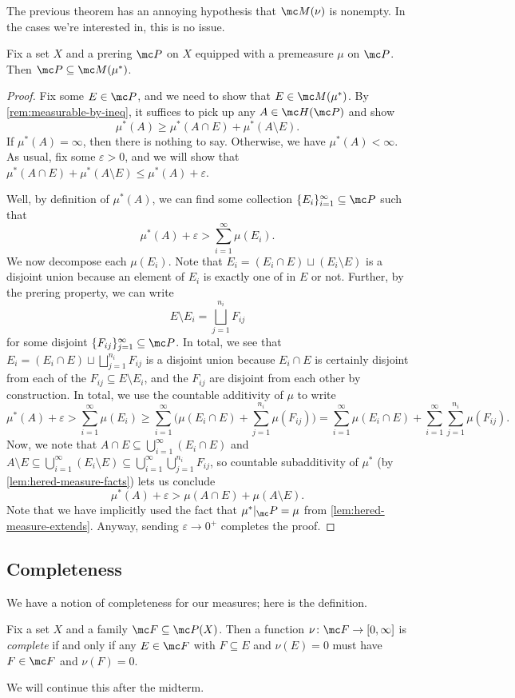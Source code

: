 \documentclass[../notes.tex]{subfiles}
\begin{document}
The previous theorem has an annoying hypothesis that $\mc M(\nu)$ is nonempty. In the cases we're interested in, this is no issue.
\begin{theorem} \label{thm:prering-is-measurable}
	Fix a set $X$ and a prering $\mc P$ on $X$ equipped with a premeasure $\mu$ on $\mc P$. Then $\mc P\subseteq\mc M(\mu^*)$.
\end{theorem}
\begin{proof}
	Fix some $E\in\mc P$, and we need to show that $E\in\mc M(\mu^*)$. By \autoref{rem:measurable-by-ineq}, it suffices to pick up any $A\in\mc H(\mc P)$ and show
	\[\mu^*(A)\ge\mu^*(A\cap E)+\mu^*(A\setminus E).\]
	If $\mu^*(A)=\infty$, then there is nothing to say. Otherwise, we have $\mu^*(A)<\infty$. As usual, fix some $\varepsilon>0$, and we will show that $\mu^*(A\cap E)+\mu^*(A\setminus E)\le\mu^*(A)+\varepsilon$.

	Well, by definition of $\mu^*(A)$, we can find some collection $\{E_i\}_{i=1}^\infty\subseteq\mc P$ such that
	\[\mu^*(A)+\varepsilon>\sum_{i=1}^\infty\mu(E_i).\]
	We now decompose each $\mu(E_i)$. Note that $E_i=(E_i\cap E)\sqcup(E_i\setminus E)$ is a disjoint union because an element of $E_i$ is exactly one of in $E$ or not. Further, by the prering property, we can write
	\[E\setminus E_i=\bigsqcup_{j=1}^{n_i}F_{ij}\]
	for some disjoint $\{F_{ij}\}_{j=1}^\infty\subseteq\mc P$. In total, we see that $E_i=(E_i\cap E)\sqcup\bigsqcup_{j=1}^{n_i}F_{ij}$ is a disjoint union because $E_i\cap E$ is certainly disjoint from each of the $F_{ij}\subseteq E\setminus E_i$, and the $F_{ij}$ are disjoint from each other by construction. In total, we use the countable additivity of $\mu$ to write
	\[\mu^*(A)+\varepsilon > \sum_{i=1}^\infty\mu(E_i) \ge \sum_{i=1}^\infty\Bigg(\mu(E_i\cap E)+\sum_{j=1}^{n_i}\mu(F_{ij})\Bigg)=\sum_{i=1}^\infty\mu(E_i\cap E)+\sum_{i=1}^\infty\sum_{j=1}^{n_i}\mu(F_{ij}).\]
	Now, we note that $A\cap E\subseteq\bigcup_{i=1}^\infty(E_i\cap E)$ and $A\setminus E\subseteq\bigcup_{i=1}^\infty(E_i\setminus E)\subseteq\bigcup_{i=1}^\infty\bigcup_{j=1}^{n_i}F_{ij}$, so countable subadditivity of $\mu^*$ (by \autoref{lem:hered-measure-facts}) lets us conclude
	\[\mu^*(A)+\varepsilon>\mu(A\cap E)+\mu(A\setminus E).\]
	Note that we have implicitly used the fact that $\mu^*|_\mc P=\mu$ from \autoref{lem:hered-measure-extends}. Anyway, sending $\varepsilon\to0^+$ completes the proof.
\end{proof}

\subsection{Completeness}
We have a notion of completeness for our measures; here is the definition.
\begin{definition}[Compelete]
	Fix a set $X$ and a family $\mc F\subseteq\mc P(X)$. Then a function $\nu\colon\mc F\to[0,\infty]$ is \textit{complete} if and only if any $E\in\mc F$ with $F\subseteq E$ and $\nu(E)=0$ must have $F\in\mc F$ and $\nu(F)=0$.
\end{definition}
We will continue this after the midterm.
\end{document}
